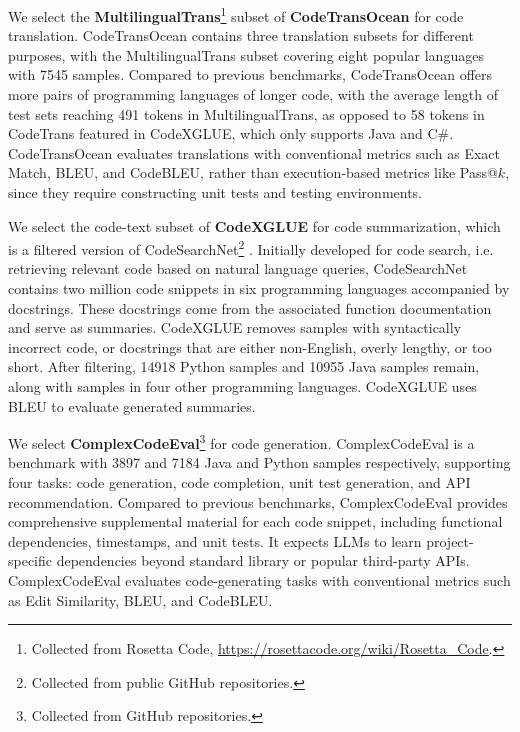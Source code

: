 We select the \textbf{MultilingualTrans}\footnote{Collected from Rosetta Code, \url{https://rosettacode.org/wiki/Rosetta_Code}.} subset of \textbf{CodeTransOcean} \cite{DBLP:conf/emnlp/YanTLCW23} for code translation. CodeTransOcean contains three translation subsets for different purposes, with the MultilingualTrans subset covering eight popular languages with 7545 samples. Compared to previous benchmarks, CodeTransOcean offers more pairs of programming languages of longer code, with the average length of test sets reaching 491 tokens in MultilingualTrans, as opposed to 58 tokens in CodeTrans featured in CodeXGLUE, which only supports Java and C\#. CodeTransOcean evaluates translations with conventional metrics such as Exact Match, BLEU, and CodeBLEU, rather than execution-based metrics like Pass@\(k\), since they require constructing unit tests and testing environments.

We select the code-text subset of \textbf{CodeXGLUE} \cite{DBLP:conf/nips/LuGRHSBCDJTLZSZ21} for code summarization, which is a filtered version of CodeSearchNet\footnote{Collected from public GitHub repositories.} \cite{DBLP:journals/corr/abs-1909-09436}. Initially developed for code search, i.e. retrieving relevant code based on natural language queries, CodeSearchNet contains two million code snippets in six programming languages accompanied by docstrings. These docstrings come from the associated function documentation and serve as summaries. CodeXGLUE removes samples with syntactically incorrect code, or docstrings that are either non-English, overly lengthy, or too short. After filtering, 14918 Python samples and 10955 Java samples remain, along with samples in four other programming languages. CodeXGLUE uses BLEU to evaluate generated summaries.

We select \textbf{ComplexCodeEval}\footnote{Collected from GitHub repositories.} \cite{DBLP:journals/corr/abs-2409-10280} for code generation. ComplexCodeEval is a benchmark with 3897 and 7184 Java and Python samples respectively, supporting four tasks: code generation, code completion, unit test generation, and API recommendation. Compared to previous benchmarks, ComplexCodeEval provides comprehensive supplemental material for each code snippet, including functional dependencies, timestamps, and unit tests. It expects LLMs to learn project-specific dependencies beyond standard library or popular third-party APIs. ComplexCodeEval evaluates code-generating tasks with conventional metrics such as Edit Similarity, BLEU, and CodeBLEU. %

